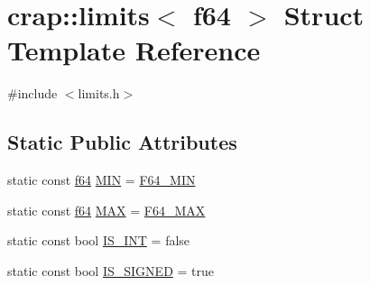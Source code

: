 \hypertarget{structcrap_1_1limits_3_01f64_01_4}{\section{crap\-:\-:limits$<$ f64 $>$ Struct Template Reference}
\label{structcrap_1_1limits_3_01f64_01_4}
}


{\ttfamily \#include $<$limits.\-h$>$}

\subsection*{Static Public Attributes}
\begin{DoxyCompactItemize}
\item 
static const \hyperlink{types_8h_a76c9f53497f766e57b184bc8a93ab73f}{f64} \hyperlink{structcrap_1_1limits_3_01f64_01_4_a1f7e2f5b5f8d1e47cbb95028a5dcc73a}{M\-I\-N} = \hyperlink{types_8h_a4ef26fd77745fadb40f370d63943d5eb}{F64\-\_\-\-M\-I\-N}
\item 
static const \hyperlink{types_8h_a76c9f53497f766e57b184bc8a93ab73f}{f64} \hyperlink{structcrap_1_1limits_3_01f64_01_4_aaffd447f57d01908c6549471a875b43c}{M\-A\-X} = \hyperlink{types_8h_a82daf28d8d0052302ccf95c163687ce5}{F64\-\_\-\-M\-A\-X}
\item 
static const bool \hyperlink{structcrap_1_1limits_3_01f64_01_4_a1aea3bbcfe3342c3105af4913b439c7e}{I\-S\-\_\-\-I\-N\-T} = false
\item 
static const bool \hyperlink{structcrap_1_1limits_3_01f64_01_4_a746e4464e01c3ddb2fca1ed15d66e8f5}{I\-S\-\_\-\-S\-I\-G\-N\-E\-D} = true
\end{DoxyCompactItemize}


